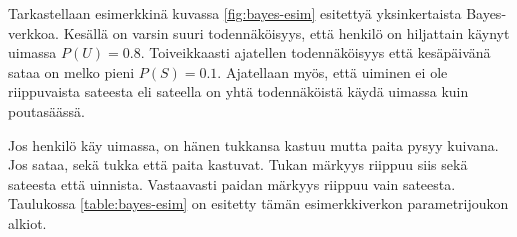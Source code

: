 Tarkastellaan esimerkkinä kuvassa \ref{fig:bayes-esim} esitettyä yksinkertaista Bayes-verkkoa. Kesällä on varsin suuri todennäköisyys, että henkilö on hiljattain käynyt uimassa $P(U) = 0.8$. Toiveikkaasti ajatellen todennäköisyys että kesäpäivänä sataa on melko pieni $P(S) = 0.1$. Ajatellaan myös, että uiminen ei ole riippuvaista sateesta eli sateella on yhtä todennäköistä käydä uimassa kuin poutasäässä.

\begin{center}
\end{center}
    
Jos henkilö käy uimassa, on hänen tukkansa kastuu mutta paita pysyy kuivana. Jos sataa, sekä tukka että paita kastuvat. Tukan märkyys riippuu siis sekä sateesta että uinnista. Vastaavasti paidan märkyys riippuu vain sateesta. Taulukossa \ref{table:bayes-esim} on esitetty tämän esimerkkiverkon parametrijoukon alkiot.

